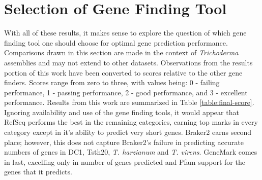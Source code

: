 \section{Selection of Gene Finding Tool}
\label{chapter:conclusion}

With all of these results, it makes sense to explore the question of
which gene finding tool one should choose for optimal gene prediction
performance. Comparisons drawn in this section are made in the context
of \textit{Trichoderma} assemblies and may not extend to other
datasets. Observations from the results portion of this work have been
converted to scores relative to the other gene finders. Scores range
from zero to three, with values being: 0 - failing performance, 1 -
passing performance, 2 - good performance, and 3 - excellent
performance. Results from this work are summarized in Table
\ref{table:final-score}. Ignoring availability and use of the gene
finding tools, it would appear that RefSeq performs the best in the
remaining categories, earning top marks in every category except in
it's ability to predict very short genes. Braker2 earns second place;
however, this does not capture Braker2's failure in predicting
accurate numbers of genes in DC1, Tsth20, \textit{T. harzianum} and
\textit{T. virens}. GeneMark comes in last, excelling only in number
of genes predicted and Pfam support for the genes that it predicts.

